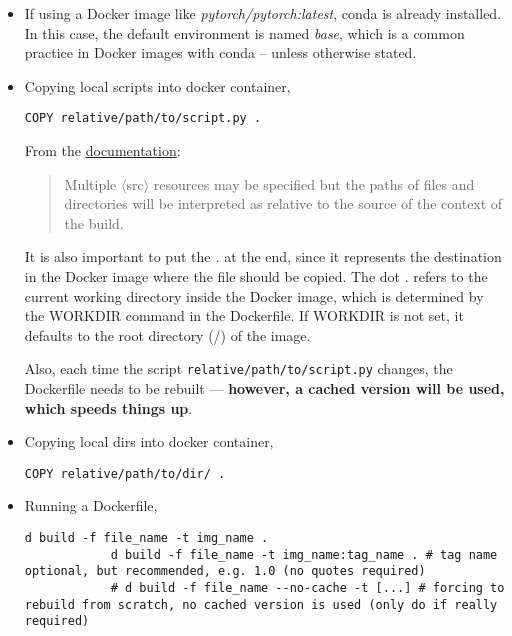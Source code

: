 \documentclass[12pt, a4paper]{scrbook}
\numberwithin{equation}{section}
\theoremstyle{definition}
\theoremstyle{definition}
\begin{document}
\begin{itemize}
		\item If using a Docker image like \textit{pytorch/pytorch:latest}, conda is already installed. In this case, the default environment is named \textit{base}, which is a common practice in Docker images with conda -- unless otherwise stated. 
		
		\item Copying local scripts into docker container, 
		
		\begin{lstlisting}[style=mystylebash, label=alg:docker_copy, xleftmargin=\parindent]
			COPY relative/path/to/script.py .
		\end{lstlisting}
		
		From the \href{https://docs.docker.com/engine/reference/builder/#copy}{documentation}:
		
		\begin{quote}
			Multiple $\langle$src$\rangle$ resources may be specified but the paths of files and directories will be interpreted as relative to the source of the context of the build. 
		\end{quote}
		
		It is also important to put the \textit{.} at the end, since it represents the destination in the Docker image where the file should be copied. The dot . refers to the current working directory inside the Docker image, which is determined by the WORKDIR command in the Dockerfile. If WORKDIR is not set, it defaults to the root directory (/) of the image.
		
		Also, each time the script \texttt{relative/path/to/script.py} changes, the Dockerfile needs to be rebuilt --- \textbf{however, a cached version will be used, which speeds things up}.
		
		\item Copying local dirs into docker container, 
		
		\begin{lstlisting}[style=mystylebash, label=alg:docker__copy_dir, xleftmargin=\parindent]
			COPY relative/path/to/dir/ .
		\end{lstlisting}
		
		\item Running a Dockerfile,
		
		\begin{lstlisting}[style=mystylebash, label=alg:docker_build, xleftmargin=\parindent]
			d build -f file_name -t img_name .
			d build -f file_name -t img_name:tag_name . # tag name optional, but recommended, e.g. 1.0 (no quotes required)
			# d build -f file_name --no-cache -t [...] # forcing to rebuild from scratch, no cached version is used (only do if really required)
		\end{lstlisting} 
		

\end{itemize}
\end{document}
